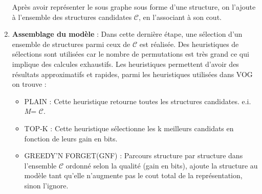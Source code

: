 \begin{enumerate}
  
Après avoir représenter le sous graphe sous forme d'une structure, on l'ajoute à l'ensemble des structures candidates $\mathcal{C}$, en l'associant à son cout.

\item \textbf{Assemblage du modèle }: Dans cette dernière étape, une sélection d'un ensemble de structures parmi ceux de $\mathcal{C}$ est réalisée. Des heuristiques de sélections sont utilisées car le nombre de permutations est très grand ce qui implique des calcules exhaustifs. Les heuristiques permettent d'avoir des résultats approximatifs et rapides, parmi les heuristiques utilisées dans VOG on trouve :
\begin{itemize}
\item PLAIN : Cette heuristique retourne toutes les structures candidates. e.i. \textit{M}= $\mathcal{C}$.
\item TOP-K :  Cette heuristique sélectionne les k meilleurs candidats en fonction de leurs gain en bits.
\item GREEDY'N FORGET(GNF) : Parcours structure par structure dans l'ensemble $\mathcal{C}$ ordonné selon la qualité (gain en bits), ajoute la structure au modèle tant qu'elle n'augmente pas le cout total de la représentation, sinon l'ignore.
\end{itemize}  
\end{enumerate}







